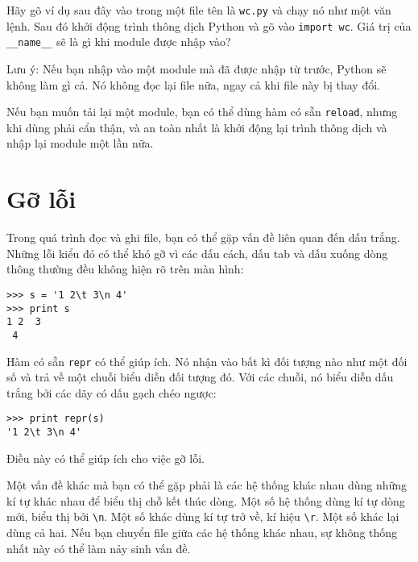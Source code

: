 \documentclass[11pt]{book}
\begin{document}
\begin{ex}

Hãy gõ ví dụ sau đây vào trong một file tên là {\tt wc.py} và chạy
nó như một văn lệnh. Sau đó khởi động trình thông dịch Python
và gõ vào {\tt import wc}.  Giá trị của \verb"__name__" sẽ là gì
khi module được nhập vào?

Lưu ý: Nếu bạn nhập vào một module mà đã được nhập từ trước,
Python sẽ không làm gì cả. Nó không đọc lại file nữa, ngay cả
khi file này bị thay đổi.


Nếu bạn muốn tải lại một module, bạn có thể dùng hàm có sẵn
{\tt reload}, nhưng khi dùng phải cẩn thận, và an toàn nhất là
khởi động lại trình thông dịch và nhập lại module một lần nữa.
\end{ex}



\section{Gỡ lỗi}


Trong quá trình đọc và ghi file, bạn có thể gặp vấn đề liên quan đến
dấu trắng. Những lỗi kiểu đó có thể khó gỡ vì các dấu cách, dấu tab
và dấu xuống dòng thông thường đều không hiện rõ trên màn hình:

\beforeverb
\begin{verbatim}
>>> s = '1 2\t 3\n 4'
>>> print s
1 2	 3
 4
\end{verbatim}
\afterverb


Hàm có sẵn {\tt repr} có thể giúp ích. Nó nhận vào bất kì đối tượng nào
như một đối số và trả về một chuỗi biểu diễn đối tượng đó. Với các
chuỗi, nó biểu diễn dấu trắng bởi các dãy có dấu gạch chéo ngược:

\beforeverb
\begin{verbatim}
>>> print repr(s)
'1 2\t 3\n 4'
\end{verbatim}
\afterverb

Điều này có thể giúp ích cho việc gỡ lỗi.

Một vấn đề khác mà bạn có thể gặp phải là các hệ thống khác nhau
dùng những kí tự khác nhau để biểu thị chỗ kết thúc dòng. Một số
hệ thống dùng kí tự dòng mới, biểu thị bởi \verb"\n".  Một số khác
dùng kí tự trở về, kí hiệu \verb"\r".  Một số khác lại dùng cả hai.
Nếu bạn chuyển file giữa các hệ thống khác nhau, sự không thống
nhất này có thể làm nảy sinh vấn đề.
\end{document}
